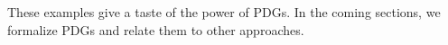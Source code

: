 \documentclass[the-pdg-manual.tex]{subfiles}
\begin{document}
These examples give a taste of the power of PDGs.  In the coming sections, we formalize PDGs and relate them to other approaches.		
\end{document}
